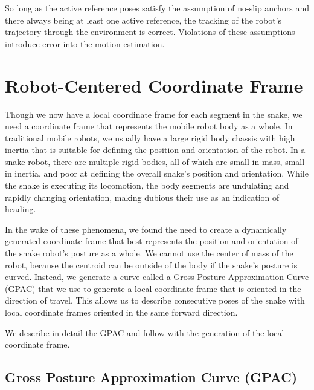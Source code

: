 So long as the active reference poses satisfy the assumption of no-slip anchors and there always being at least one active reference, the tracking of the robot's trajectory through the environment is correct.  Violations of these assumptions introduce error into the motion estimation.

\section{Robot-Centered Coordinate Frame}


\label{sec:GPAC}

Though we now have a local coordinate frame for each segment in the snake, we need a coordinate frame that represents the mobile robot body as a whole.  In traditional mobile robots, we usually have a large rigid body chassis with high inertia that is suitable for defining the position and orientation of the robot.  In a snake robot, there are multiple rigid bodies, all of which are small in mass, small in inertia, and poor at defining the overall snake's position and orientation.  While the snake is executing its locomotion, the body segments are undulating and rapidly changing orientation, making dubious their use as an indication of heading.

In the wake of these phenomena, we found the need to create a dynamically generated coordinate frame that best represents the position and orientation of the snake robot's posture as a whole.  We cannot use the center of mass of the robot, because the centroid can be outside of the body if the snake's posture is curved.  Instead, we generate a curve called a Gross Posture Approximation Curve (GPAC) that we use to generate a local coordinate frame that is oriented in the direction of travel.  This allows us to describe consecutive poses of the snake with local coordinate frames oriented in the same forward direction.

We describe in detail the GPAC and follow with the generation of the local coordinate frame.

\subsection{Gross Posture Approximation Curve (GPAC) }

